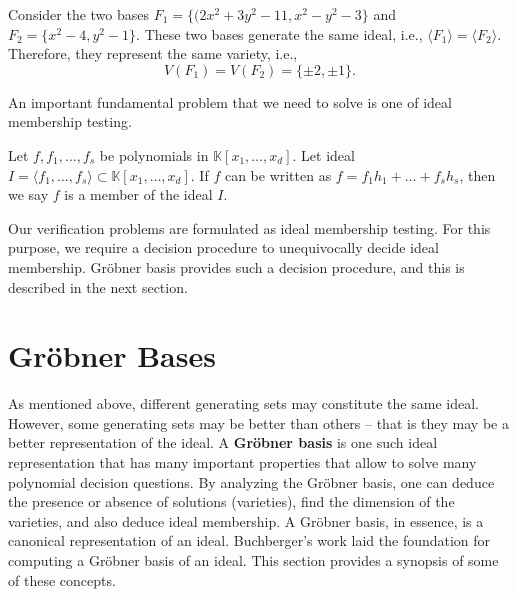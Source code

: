 \begin{Example}
	Consider the two bases $F_{1}=\{(2x^{2}+3y^{2}-11,x^{2}-y^{2}-3\}$ and $F_{2}=\{x^{2}-4,y^{2}-1\}$.
	These two bases generate the same ideal, i.e., $\langle F_{1}\rangle= \langle F_{2} \rangle$.{}
	Therefore, they represent the same variety, i.e., 
	\begin{equation}
		V(F_{1})= V( F_{2})=\{\pm 2, \pm 1\}.
	\end{equation}
\end{Example}

An important fundamental problem that we need to solve is one of ideal membership testing.
\begin{Definition}
	Let $f, f_{1},\dots, f_{s}$ be polynomials in $\mathbb{K}[x_{1},\dots,x_{d}]$.
	Let ideal $I=\langle f_{1},\dots, f_{s} \rangle \subset \mathbb{K}[x_{1},\dots,x_{d}]$.
	If $f$ can be written as $f=f_{1}h_{1}+\dots+f_{s}h_{s}$, then we say $f$ is a member of the ideal $I$. 
\end{Definition}

Our verification problems are formulated as ideal membership testing. For this purpose, we require a decision procedure
to unequivocally decide ideal membership. Gr\"obner basis provides such a decision procedure, and this is described in 
the next section. 

\section{Gr\"obner Bases}

As mentioned above, different generating sets may constitute the same ideal. However, some generating sets
may be better than others -- that is they may be a better representation of the ideal. A {\bf Gr\"obner basis}
is one such ideal representation that has many important properties that allow to solve many polynomial decision
questions. By analyzing the Gr\"obner basis, one can deduce the presence or absence of solutions (varieties), 
find the dimension of the varieties, and also deduce ideal membership. 
A Gr\"obner basis, in essence, is a canonical representation of an ideal.
Buchberger's work \cite{buchberger_thesis} laid the
foundation for computing a Gr\"obner basis of an ideal.  
This section provides a synopsis of some of these concepts.


